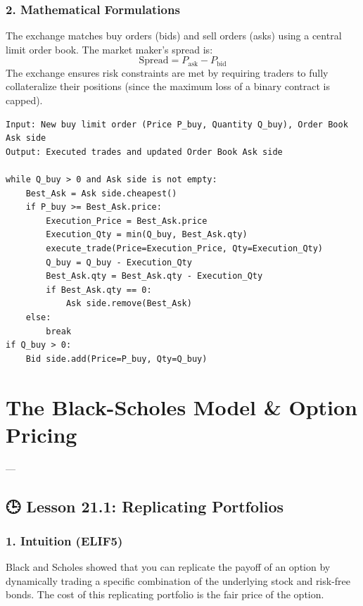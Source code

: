 \documentclass[11pt,oneside]{book}
\begin{document}
\subsection{2. Mathematical Formulations}
The exchange matches buy orders (bids) and sell orders (asks) using a central limit order book. The market maker's spread is:
$$\text{Spread} = P_{\text{ask}} - P_{\text{bid}}$$
The exchange ensures risk constraints are met by requiring traders to fully collateralize their positions (since the maximum loss of a binary contract is capped).

\begin{tcolorbox}[colback=white,colframe=black,boxrule=0.6pt,arc=0mm,title=Order Matching Engine]
\begin{verbatim}
Input: New buy limit order (Price P_buy, Quantity Q_buy), Order Book Ask side
Output: Executed trades and updated Order Book Ask side

while Q_buy > 0 and Ask side is not empty:
    Best_Ask = Ask side.cheapest()
    if P_buy >= Best_Ask.price:
        Execution_Price = Best_Ask.price
        Execution_Qty = min(Q_buy, Best_Ask.qty)
        execute_trade(Price=Execution_Price, Qty=Execution_Qty)
        Q_buy = Q_buy - Execution_Qty
        Best_Ask.qty = Best_Ask.qty - Execution_Qty
        if Best_Ask.qty == 0:
            Ask side.remove(Best_Ask)
    else:
        break
if Q_buy > 0:
    Bid side.add(Price=P_buy, Qty=Q_buy)
\end{verbatim}
\end{tcolorbox}


\newpage

\chapter{The Black-Scholes Model & Option Pricing}

---

\section{🕒 Lesson 21.1: Replicating Portfolios}

\subsection{1. Intuition (ELIF5)}
Black and Scholes showed that you can replicate the payoff of an option by dynamically trading a specific combination of the underlying stock and risk-free bonds. The cost of this replicating portfolio is the fair price of the option.
\end{document}
